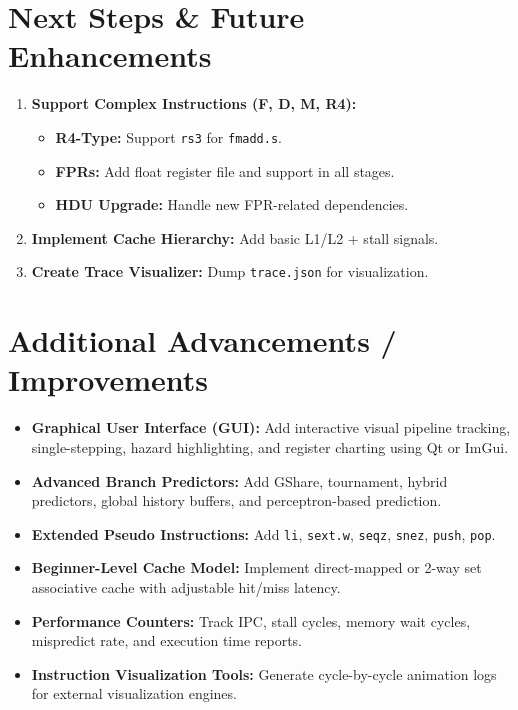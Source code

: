 \documentclass[11pt, a4paper]{article}
\begin{document}
\section{Next Steps \& Future Enhancements}
\begin{enumerate}
    \item \textbf{Support Complex Instructions (F, D, M, R4):}
    \begin{itemize}[leftmargin=*]
        \item \textbf{R4-Type:} Support \texttt{rs3} for \texttt{fmadd.s}.
        \item \textbf{FPRs:} Add float register file and support in all stages.
        \item \textbf{HDU Upgrade:} Handle new FPR-related dependencies.
    \end{itemize}
    \item \textbf{Implement Cache Hierarchy:} Add basic L1/L2 + stall signals.
    \item \textbf{Create Trace Visualizer:} Dump \texttt{trace.json} for visualization.
\end{enumerate}

\section{Additional Advancements / Improvements}
\begin{itemize}[leftmargin=*]
    \item \textbf{Graphical User Interface (GUI):} Add interactive visual pipeline tracking, single-stepping, hazard highlighting, and register charting using Qt or ImGui.
    \item \textbf{Advanced Branch Predictors:} Add GShare, tournament, hybrid predictors, global history buffers, and perceptron-based prediction.
    \item \textbf{Extended Pseudo Instructions:} Add \texttt{li}, \texttt{sext.w}, \texttt{seqz}, \texttt{snez}, \texttt{push}, \texttt{pop}.
    \item \textbf{Beginner-Level Cache Model:} Implement direct-mapped or 2-way set associative cache with adjustable hit/miss latency.
    \item \textbf{Performance Counters:} Track IPC, stall cycles, memory wait cycles, mispredict rate, and execution time reports.
    \item \textbf{Instruction Visualization Tools:} Generate cycle-by-cycle animation logs for external visualization engines.
\end{itemize}
\end{document}

